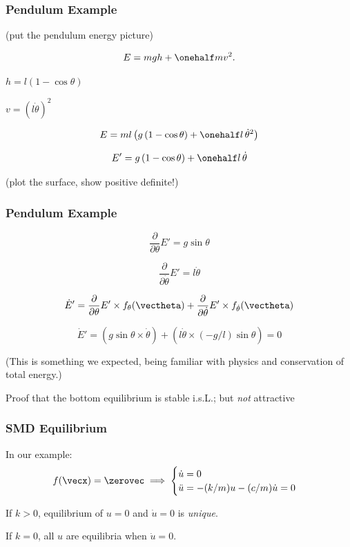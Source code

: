 \documentclass[12pt]{beamer}
\begin{document}
\begin{frame}



\end{frame}





\begin{frame}
\frametitle{Pendulum Example}

(put the pendulum energy picture)

\[
E = mgh + \onehalf m v^2.
\]

$h = l(1-\cos\theta)$

$v = (l\dot\theta)^2$

\[
E
	= ml \left( g \, (1-\cos\theta) + \onehalf l \, \dot\theta^2 \right)
\]

\[
E' = g \, (1-\cos\theta) + \onehalf l \, \dot\theta
\]

(plot the surface, show positive definite!)

\end{frame}



\begin{frame}
\frametitle{Pendulum Example}
\[
\frac{\partial}{\partial\theta} E' = g \sin \theta
\]

\[
\frac{\partial}{\partial\dot\theta} E' = l \dot\theta
\]

\[
\dot E' =
	\frac{\partial}{\partial\theta} E' 
		\times f_{\theta}(\vectheta)
	+ \frac{\partial}{\partial\dot\theta} E'
		\times f_{\dot\theta}(\vectheta)
\]


\[
\dot E' =
	\left( g \sin\theta \times \dot\theta \right)
	+ \left( l \dot\theta \times (-g/l) \sin \theta \right) = 0
\]

(This is something we expected, being familiar with physics and conservation of total energy.)

Proof that the bottom equilibrium is stable i.s.L.; but \emph{not} attractive

\end{frame}











\begin{frame}
\frametitle{SMD Equilibrium}

\begin{itemize}
\vitem In our example:
\[
f(\vecx) = \zerovec \implies
\begin{cases}
	\dot u = 0	\\
	\ddot u = -(k/m) u - (c/m) \dot u = 0
\end{cases}
\]

\vitem If $k > 0$, equilibrium of $u = 0$ and $\dot u = 0$ is \emph{unique}.

\vitem If $k = 0$, all $u$ are equilibria when $\dot u = 0$.
\end{itemize}
\end{frame}
\end{document}
